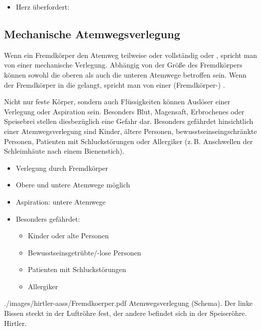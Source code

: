 {{\bigskip
}{
\begin{itemize}
  \item Herz überfordert:
\end{itemize}
}{}{}{}






\subsection{Mechanische Atemwegsverlegung}
\label{topic:mechanische-atemwegsverlegung}
\label{topic:fremdkoerperaspiration}



{%
%
Wenn ein Fremdkörper den Atemweg teilweise oder vollständig 
 oder , spricht man von einer
mechanische Verlegung. Abhängig von der Größe des
Fremdkörpers können sowohl die oberen als auch die unteren
Atemwege betroffen sein. Wenn der Fremdkörper in die
 gelangt, spricht man von einer
(Fremdkörper-) .

Nicht nur feste Körper, sondern auch Flüssigkeiten können
Auslöser einer Verlegung oder Aspiration sein. Besonders
Blut, Magensaft, Erbrochenes oder Speisebrei stellen
diesbezüglich eine Gefahr dar.
Besonders gefährdet hinsichtlich einer Atemwegsverlegung sind
Kinder, ältere Personen, bewusstseinseingschränkte Personen,
Patienten mit Schluckstörungen oder Allergiker (z.\,B.
Anschwellen der Schleimhäute nach einem Bienenstich).
}
{%
\begin{itemize}
  \item Verlegung durch Fremdkörper
  \item Obere und untere Atemwege möglich
  \item Aspiration: untere Atemwege
  \item Besonders gefährdet:
  \begin{itemize}
    \item Kinder oder alte Personen
    \item Bewusstseinsgetrübte/-lose Personen
    \item Patienten mit Schluckstörungen
    \item Allergiker
  \end{itemize}
\end{itemize}
}
{./images/hirtler-aass/Fremdkoerper.pdf}
{Atemwegsverlegung (Schema). Der linke Bissen steckt in der Luftröhre fest, der
andere befindet sich in der Speiseröhre.}
{Hirtler.}


}

